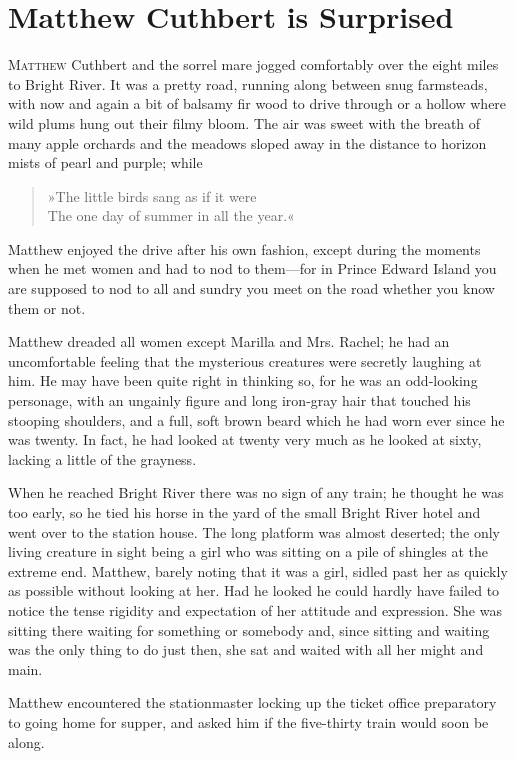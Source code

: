 \chapter{Matthew Cuthbert is Surprised}

\lettrine[lines=4]{M}{atthew} Cuthbert and the sorrel mare jogged comfortably over the eight miles to Bright River. It was a pretty road, running along between snug farmsteads, with now and again a bit of balsamy fir wood to drive through or a hollow where wild plums hung out their filmy bloom. The air was sweet with the breath of many apple orchards and the meadows sloped away in the distance to horizon mists of pearl and purple; while

\begin{verse}
»The little birds sang as if it were\\
The one day of summer in all the year.«
\end{verse}

Matthew enjoyed the drive after his own fashion, except during the moments when he met women and had to nod to them—for in Prince Edward Island you are supposed to nod to all and sundry you meet on the road whether you know them or not.

Matthew dreaded all women except Marilla and Mrs. Rachel; he had an uncomfortable feeling that the mysterious creatures were secretly laughing at him. He may have been quite right in thinking so, for he was an odd-looking personage, with an ungainly figure and long iron-gray hair that touched his stooping shoulders, and a full, soft brown beard which he had worn ever since he was twenty. In fact, he had looked at twenty very much as he looked at sixty, lacking a little of the grayness.

When he reached Bright River there was no sign of any train; he thought he was too early, so he tied his horse in the yard of the small Bright River hotel and went over to the station house. The long platform was almost deserted; the only living creature in sight being a girl who was sitting on a pile of shingles at the extreme end. Matthew, barely noting that it was a girl, sidled past her as quickly as possible without looking at her. Had he looked he could hardly have failed to notice the tense rigidity and expectation of her attitude and expression. She was sitting there waiting for something or somebody and, since sitting and waiting was the only thing to do just then, she sat and waited with all her might and main.

Matthew encountered the stationmaster locking up the ticket office preparatory to going home for supper, and asked him if the five-thirty train would soon be along.

